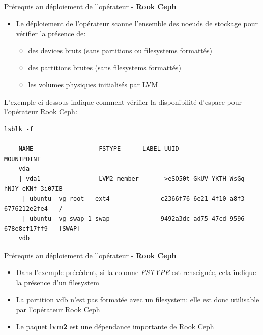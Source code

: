 
\begin{frame}[fragile]{Prérequis au déploiement de l'opérateur - \textbf{Rook Ceph}}

\begin{itemize}
   \item Le déploiement de l'opérateur scanne l'ensemble des noeuds de stockage pour vérifier la présence de:
   \begin{itemize}
      \item des devices bruts (sans partitions ou filesystems formattés)
      \item des partitions brutes (sans filesystems formattés)
      \item les volumes physiques initialisés par LVM
   \end{itemize}
\end{itemize}

L'exemple ci-dessous indique comment vérifier la disponibilité d'espace pour l'opérateur Rook Ceph:

\begin{tiny}
\begin{Verbatim}[commandchars=\\\{\}]
lsblk -f

    NAME                  FSTYPE      LABEL UUID                                   MOUNTPOINT
    vda
    |-vda1                LVM2_member       >eSO50t-GkUV-YKTH-WsGq-hNJY-eKNf-3i07IB
     |-ubuntu--vg-root   ext4              c2366f76-6e21-4f10-a8f3-6776212e2fe4   /
     |-ubuntu--vg-swap_1 swap              9492a3dc-ad75-47cd-9596-678e8cf17ff9   [SWAP]
    vdb
\end{Verbatim}
\end{tiny}

\end{frame}


\begin{frame}[fragile]{Prérequis au déploiement de l'opérateur - \textbf{Rook Ceph}}

\begin{itemize}
   \item Dans l'exemple précédent, si la colonne \textit{FSTYPE} est renseignée, cela indique la présence d'un filesystem
   \item La partition vdb n'est pas formatée avec un filesystem: elle est donc utilisable par l'opérateur Rook Ceph
   \item Le paquet \textbf{lvm2} est une dépendance importante de Rook Ceph
\end{itemize}

\end{frame}

